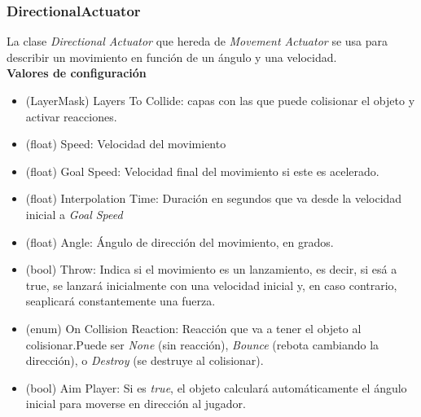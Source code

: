 \subsubsection{DirectionalActuator}
La clase \textit{Directional Actuator} que hereda de \textit{ Movement Actuator} se usa para describir un movimiento en función de un ángulo y una velocidad.\\
\textbf{Valores de configuración}
\begin{itemize}
	\item (LayerMask) Layers To Collide: capas con las que puede colisionar el objeto y activar reacciones.
	\item (float) Speed: Velocidad del movimiento
	\item (float) Goal Speed: Velocidad final del movimiento si este es acelerado.
	\item (float) Interpolation Time: Duración en segundos que va desde la velocidad inicial a \textit{Goal Speed}
	\item (float) Angle: Ángulo de dirección del movimiento, en grados.
	\item (bool) Throw:  Indica si el movimiento es un lanzamiento, es decir, si esá a true, se lanzará inicialmente con una velocidad inicial y, en caso contrario, seaplicará constantemente una fuerza.
	\item (enum) On Collision Reaction: Reacción que va a tener el objeto al colisionar.Puede ser \textit{None} (sin reacción), \textit{Bounce} (rebota cambiando la dirección), o \textit{Destroy} (se destruye al colisionar).
	\item (bool) Aim Player: Si es \textit{true}, el objeto calculará automáticamente el ángulo inicial para moverse en dirección al jugador.
\end{itemize}

